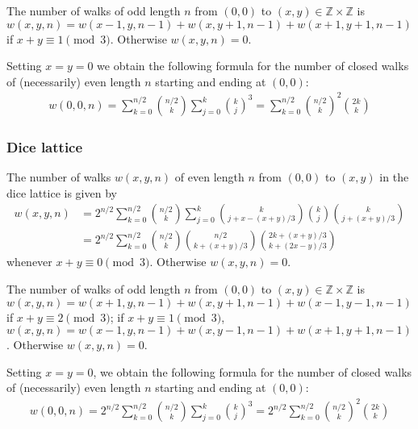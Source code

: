 \documentclass[12pt]{article}
\begin{document}
The number of walks of odd length $n$ from $(0,0)$ to $(x,y) \in \mathbb{Z} \times \mathbb{Z}$ is $w(x,y,n) = w(x-1,y,n-1) + w(x, y+1, n-1) + w(x+1, y+1, n-1)$ if $x+y \equiv 1 \pmod{3}$. Otherwise $w(x,y,n) = 0$.

Setting $x = y = 0$ we obtain the following formula for the number of closed walks of (necessarily) even length $n$ starting and ending at $(0,0)$:
\begin{align*}
  w(0,0,n) = \sum_{k=0}^{n/2} \binom{n/2}{k}\sum_{j=0}^k\binom{k}{j}^3 =  \sum_{k=0}^{n/2}\binom{n/2}{k}^2\binom{2k}{k}
\end{align*}

\subsubsection*{Dice lattice}

The number of walks $w(x,y,n)$ of even length $n$ from $(0,0)$ to $(x,y)$ in the dice lattice is given by
\begin{align*}
  w(x,y,n) &= 2^{n/2} \sum_{k=0}^{n/2} \binom{n/2}{k} \sum_{j=0}^k \binom{k}{j + x-(x+y)/3} \binom{k}{j} \binom{k}{j + (x+y)/3}\\
 &= 2^{n/2} \sum_{k=0}^{n/2}\binom{n/2}{k}\binom{n/2}{k+(x+y)/3}\binom{2k+(x+y)/3}{k+(2x-y)/3}
 \end{align*}
whenever $x+y \equiv 0 \pmod{3}$. Otherwise $w(x,y,n) = 0$.  

The number of walks of odd length $n$ from $(0,0)$ to $(x,y) \in \mathbb{Z} \times \mathbb{Z}$ is $w(x,y,n) = w(x+1,y,n-1) + w(x,y+1,n-1) + w(x-1,y-1,n-1)$ if $x+y \equiv 2 \pmod{3}$; if $x+y \equiv 1 \pmod{3}$, $w(x,y,n) = w(x-1,y,n-1) + w(x,y-1,n-1) + w(x+1,y+1,n-1)$. Otherwise $w(x,y,n) = 0$.

Setting $x = y = 0$, we obtain the following formula for the number of closed walks of (necessarily) even length $n$ starting and ending at $(0,0)$:
\begin{align*}
  w(0,0,n) = 2^{n/2}\sum_{k=0}^{n/2} \binom{n/2}{k} \sum_{j=0}^k \binom{k}{j}^3 = 2^{n/2}\sum_{k=0}^{n/2}\binom{n/2}{k}^2\binom{2k}{k}
\end{align*}

\end{document}
